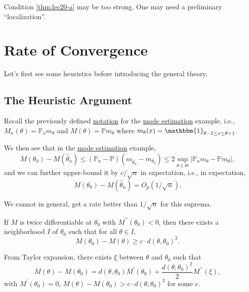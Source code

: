 \begin{remark}
	Condition \autoref{thm:lec20-a} may be too strong. One may need a preliminary ``localization''.
\end{remark}

\section{Rate of Convergence}
Let's first see some heuristics before introducing the general theory.

\subsection{The Heuristic Argument}
\begin{prev}
	Recall the previously defined \hyperref[not:M-estimation]{notation} for the \hyperref[eg:mode-estimation]{mode estimation} example, i.e., \(M_n(\theta ) = \mathbb{P} _n m_\theta \) and \(M(\theta ) = \mathbb{P} m_\theta \) where \(m_\theta (x) = \mathbbm{1}_{\theta -1 \leq x \leq \theta +1} \).
\end{prev}

We then see that in the \hyperref[eg:mode-estimation]{mode estimation} example,
\[
	M(\theta _0) - M(\hat{\theta} _n)
	\leq (\mathbb{P} _n - \mathbb{P} ) (m_{\hat{\theta } _n } - m_{\theta _0})
	\leq 2 \sup _{\theta \in \Theta } \vert \mathbb{P} _n m_\theta - \mathbb{P} m_\theta \vert,
\]
and we can further upper-bound it by \(c / \sqrt{n} \) in expectation, i.e., in expectation,
\[
	M(\theta _0) - M(\hat{\theta } _n ) = O_p(1 / \sqrt{n} ).
\]

\begin{note}
	We cannot in general, get a rate better than \(1 / \sqrt{n} \) for this suprema.
\end{note}

\begin{remark}
	If \(M\) is twice differentiable at \(\theta _0\) with \(M^{\prime\prime} (\theta _0) < 0\), then there exists a neighborhood \(I\) of \(\theta _0\) such that for all \(\theta \in I\),
	\[
		M(\theta _0) - M(\theta ) \geq c \cdot d(\theta, \theta _0)^2.
	\]
\end{remark}
\begin{explanation}
	From Taylor expansion, there exists \(\xi \) between \(\theta \) and \(\theta _0\) such that
	\[
		M(\theta ) - M(\theta _0)
		= d(\theta, \theta _0) M^{\prime} (\theta _0) + \frac{d(\theta, \theta _0)^2}{2} M^{\prime\prime} (\xi ),
	\]
	with \(M^{\prime} (\theta _0) = 0\), \(M(\theta ) - M(\theta _0) > c \cdot d(\theta, \theta _0)^2\) for some \(c\).
\end{explanation}

